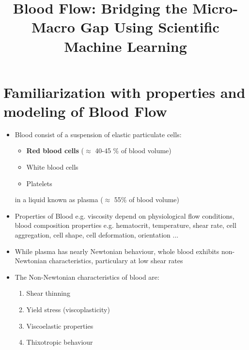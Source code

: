 \documentclass{beamer}
\author{}
\title{Blood Flow: Bridging the Micro-Macro Gap Using Scientific Machine Learning}
\institute{}
\begin{document}
	\begin{frame}
    \titlepage
    \end{frame}

	
	\begin{frame}
		\tableofcontents[sectionstyle=show,subsectionstyle=show/shaded/hide,subsubsectionstyle=show/shaded/hide]
	\end{frame}
		
	

	
	\section[Blood properties]{Familiarization with properties and modeling of Blood Flow}
		    \begin{frame}
			    \begin{itemize}
			    \item Blood consist of a suspension of elastic particulate cells:
\begin{itemize}
    \item \textbf{Red blood cells} ($\approx$ 40-45 \% of blood volume)
    \item White blood cells
    \item Platelets
\end{itemize}
in a liquid known as plasma ($\approx$ 55\% of blood volume)
			    \item Properties of Blood e.g. viscosity depend on physiological flow conditions, blood composition properties e.g. hematocrit, temperature, shear rate, cell aggregation, cell shape, cell deformation, orientation ...
			    			    \end{itemize}	
		    \end{frame}
		    
		 
	\begin{frame}
    	\begin{itemize}
    	\item While plasma has nearly Newtonian behaviour, whole blood exhibits non-Newtonian characteristics, particulary at low shear rates
    	\item   The Non-Newtonian characteristics of blood are:
			    \begin{enumerate}
			    \item Shear thinning
			    \item Yield stress (viscoplasticity)
			    \item Viscoelastic properties
			     \item Thixotropic behaviour
			    \end{enumerate}	
    	\end{itemize}
    \end{frame}
	
\end{document}

